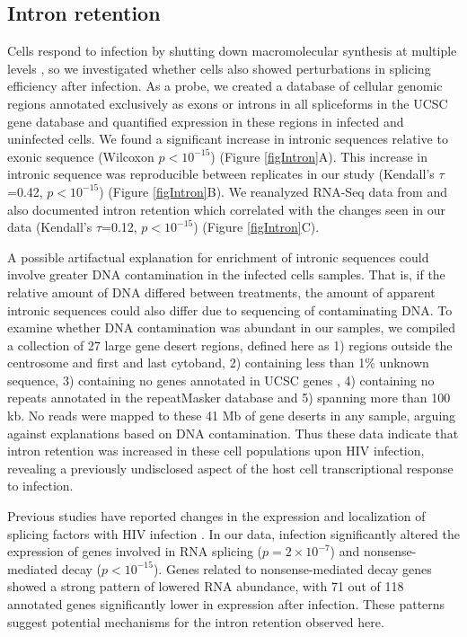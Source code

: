 \documentclass[../sherrill-Mix_thesis.tex]{subfiles}
\begin{document}
	
	\subsection{Intron retention} %
		Cells respond to infection by shutting down macromolecular synthesis at multiple levels \citep{Iwase1997,Johnstone1998,Williams1999,Ramana2000,Liang2006}, so we investigated whether cells also showed perturbations in splicing efficiency after infection. As a probe, we created a database of cellular genomic regions annotated exclusively as exons or introns in all spliceforms in the UCSC gene database \citep{Hsu2006} and quantified expression in these regions in infected and uninfected cells. We found a significant increase in intronic sequences relative to exonic sequence (Wilcoxon $p<10^{-15}$) (Figure \ref{figIntron}A).  This increase in intronic sequence was reproducible between replicates in our study (Kendall's $\tau$=0.42, $p<10^{-15}$) (Figure \ref{figIntron}B). We reanalyzed RNA-Seq data from \citet{Chang2011} and also documented intron retention which correlated with the changes seen in our data (Kendall's $\tau$=0.12, $p<10^{-15}$) (Figure \ref{figIntron}C).

		A possible artifactual explanation for enrichment of intronic sequences could involve greater DNA contamination in the infected cells samples. That is, if the relative amount of DNA differed between treatments, the amount of apparent intronic sequences could also differ due to sequencing of contaminating DNA. To examine wheth\-er DNA contamination was abundant in our samples, we compiled a collection of 27 large gene desert regions, defined here as 1) regions outside the centrosome and first and last cytoband, 2) containing less than 1\% unknown sequence, 3) containing no genes annotated in UCSC genes \citep{Hsu2006}, 4) containing no repeats annotated in the repeatMasker database \citep{Jurka2005} and 5) spanning more than 100 kb. No reads were mapped to these 41 Mb of gene deserts in any sample, arguing against explanations based on DNA contamination. Thus these data indicate that intron retention was increased in these cell populations upon HIV infection, revealing a previously undisclosed aspect of the host cell transcriptional response to infection.
		
		  Previous studies have reported changes in the expression and localization of splicing factors with HIV infection \citep{Maldarelli1998,Dowling2008,Monette2009}. In our data, \hivEight{} infection significantly altered the expression of genes involved in RNA splicing ($p=2\times10^{-7}$) and nonsense-mediated decay ($p<10^{-15}$). Genes related to nonsense-mediated decay genes showed a strong pattern of lowered RNA abundance, with 71 out of 118 annotated genes significantly lower in expression after infection. These patterns suggest potential mechanisms for the intron retention observed here.
		
\end{document}

